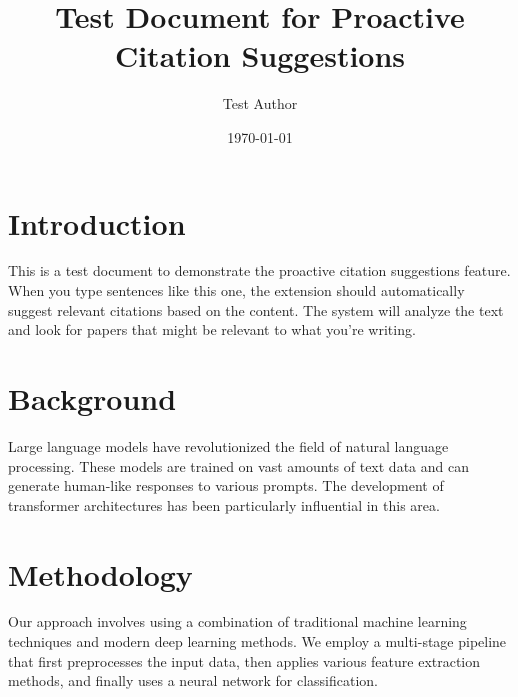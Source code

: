 \documentclass{article}
\title{Test Document for Proactive Citation Suggestions}
\author{Test Author}
\date{\today}
\begin{document}
\maketitle

\section{Introduction}

This is a test document to demonstrate the proactive citation suggestions feature. When you type sentences like this one, the extension should automatically suggest relevant citations based on the content. The system will analyze the text and look for papers that might be relevant to what you're writing.

\section{Background}

Large language models have revolutionized the field of natural language processing. These models are trained on vast amounts of text data and can generate human-like responses to various prompts. The development of transformer architectures has been particularly influential in this area.

\section{Methodology}

Our approach involves using a combination of traditional machine learning techniques and modern deep learning methods. We employ a multi-stage pipeline that first preprocesses the input data, then applies various feature extraction methods, and finally uses a neural network for classification.
\end{document}

